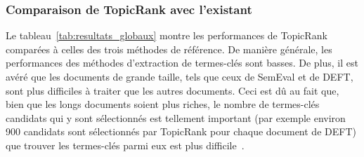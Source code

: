       \subsubsection{Comparaison de TopicRank avec l'existant}
      \label{subsubsec:main-automatic_keyphrase_annotation-unsupervised_automatic_keyphrase_extraction-evaluation-comparison}
        Le tableau~\ref{tab:resultats_globaux} montre les performances de
        TopicRank comparées à celles des trois méthodes de référence. De manière
        générale, les performances des méthodes d'extraction de termes-clés sont
        basses. De plus, il est avéré que les documents de grande taille, tels
        que ceux de SemEval et de DEFT, sont plus difficiles à traiter que les
        autres documents. Ceci est dû au fait que, bien que les longs documents
        soient plus riches, le nombre de termes-clés candidats qui y sont
        sélectionnés est tellement important (par exemple environ 900 candidats
        sont sélectionnés par TopicRank pour chaque document de DEFT) que
        trouver les termes-clés parmi eux est plus
        difficile~\cite{hasan2014state_of_the_art}.

